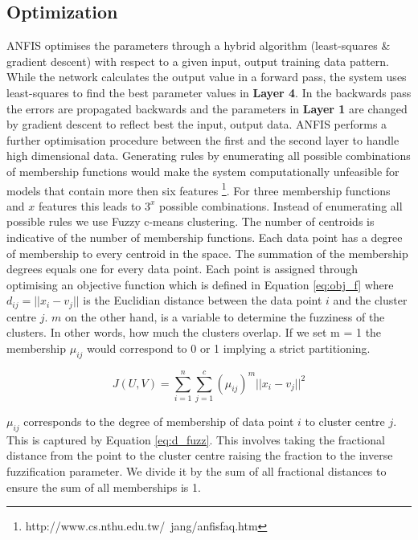 



 
 
 
 \subsection{Optimization}
 \label{optimum}
 
 ANFIS optimises the parameters through a hybrid algorithm (least-squares \& gradient descent) with respect to a given input, output training data pattern. While the network calculates the output value in a forward pass, the system uses least-squares to find the best parameter values in \textbf{Layer 4}. In the backwards pass the errors are propagated backwards and the parameters in \textbf{Layer 1} are changed by gradient descent to reflect best the input, output data. ANFIS performs a further optimisation procedure between the first and the second layer to handle high dimensional data. Generating rules by enumerating all possible combinations of membership functions would make the system computationally unfeasible for models that contain more then six features \footnote{http://www.cs.nthu.edu.tw/~jang/anfisfaq.htm}. For three membership functions and $x$ features this leads to $3^x$ possible combinations. Instead of enumerating all possible rules we use Fuzzy c-means clustering. The number of centroids is indicative of the number of membership functions. Each data point has a degree of membership to every centroid in the space. The summation of the membership degrees equals one for every data point. Each point is assigned through optimising an objective function which is defined in Equation \ref{eq:obj_f} where $d_{ij} = ||x_i - v_j||$ is the Euclidian distance between the data point $i$ and the cluster centre $j$. $m$ on the other hand, is a variable to determine the fuzziness of the clusters. In other words, how much the clusters overlap. If we set m = 1 the membership $\mu_{ij}$ would correspond to 0 or 1 implying a strict partitioning.

\begin{equation} \label{eq:obj_f}
J(U,V) = \sum\limits_{i=1} ^n \sum\limits_{j=1} ^c (\mu_{ij})^m ||x_i - v_j||^2
 \end{equation}

$\mu_{ij}$ corresponds to the degree of membership of data point $i$ to cluster centre $j$. This is captured by Equation \ref{eq:d_fuzz}. This involves taking the fractional distance from the point to the cluster centre raising the fraction to the inverse fuzzification parameter. We divide it by the sum of all fractional distances to ensure the sum of all memberships is 1. 


